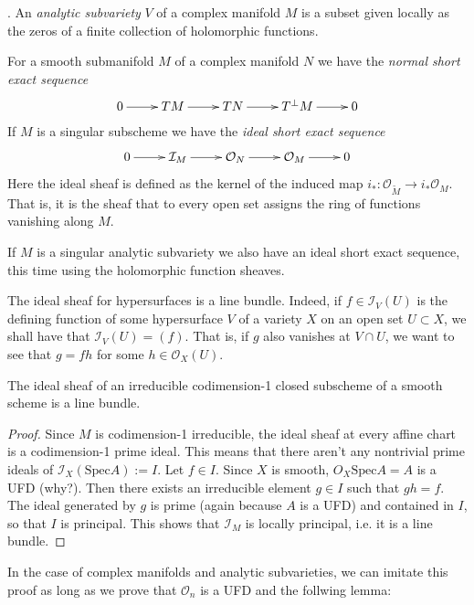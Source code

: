 \begin{definition}
\label{definition-analytic-subvariety}
\cite{gri}. An {\it analytic subvariety} $V$ of a complex manifold $M$ is a
subset given locally as the zeros of a finite collection of holomorphic
functions.
\end{definition}

For a smooth submanifold $M$ of a complex manifold $N$ we have the {\it normal 
short exact sequence}
$$
\xymatrix{
0\ar[r]&TM\ar[r]&TN\ar[r]&T^\perp M\ar[r]&0
}
$$
If $M$ is a singular subscheme we have the {\it ideal short exact sequence}
$$
\xymatrix{
0\ar[r]&\mathcal{I}_M\ar[r]&\mathcal{O}_N\ar[r]&\mathcal{O}_M\ar[r]&0
}
$$
Here the ideal sheaf is defined as the kernel of the induced map 
$i_*:\mathcal{O}_{\widetilde{M}} \to i_*\mathcal{O}_M$. That is, it is the sheaf
that to every open set assigns the ring of functions vanishing along $M$.

If $M$ is a singular analytic subvariety we also have an ideal short exact
sequence, this time using the holomorphic function sheaves.

\medskip\noindent
The ideal sheaf for hypersurfaces is a line bundle.
Indeed, if $f \in \mathcal{I}_V(U)$ is the 
defining function of some hypersurface
$V$ of a variety $X$ on an open set $U \subset X$,
we shall have that $\mathcal{I}_V(U)=(f)$. 
That is, if $g$ also vanishes at $V\cap U$,
we want to see that $g = fh$ for some $h \in \mathcal{O}_X(U)$.

\begin{lemma}
\label{lemma-ideal-sheaf-is-line-bundle-schemes}
The ideal sheaf of an irreducible codimension-1 closed subscheme of a smooth
scheme is a line bundle.
\end{lemma}

\begin{proof}
Since $M$ is codimension-1 irreducible, the ideal sheaf at every affine chart is
a codimension-1 prime ideal. This means that there aren't any nontrivial prime
ideals of $\mathcal{I}_X(\text{Spec}A):=I$. Let $f\in I$.
Since $X$ is smooth, $O_X\text{Spec}A=A$ is a UFD (why?). Then there exists an
irreducible element $g\in I$ such that $gh=f$. The ideal generated by $g$ is
prime (again because $A$ is a UFD) 
and contained in $I$, so that $I$ is principal. This shows that
$\mathcal{I}_M$ is locally principal, i.e. it is a line bundle.
\end{proof}

In the case of complex manifolds and analytic subvarieties, we can imitate
this proof as long as we prove that $\mathcal{O}_n$ is a UFD and the follwing
lemma:

